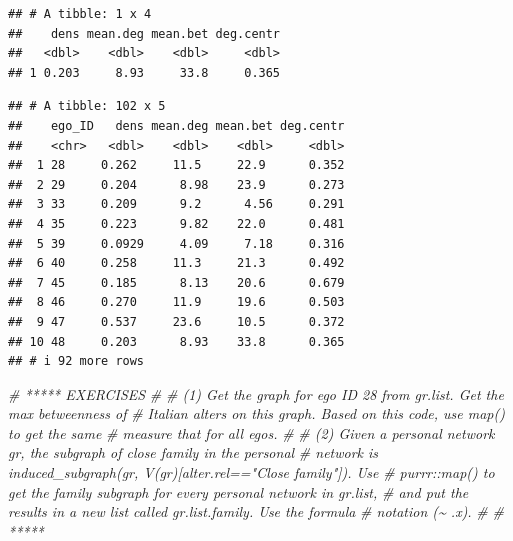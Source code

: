 \documentclass[
]{book}
\newenvironment{Shaded}{\begin{snugshade}}{\end{snugshade}}
\newcommand{\AttributeTok}[1]{\textcolor[rgb]{0.13,0.29,0.53}{#1}}
\newcommand{\CommentTok}[1]{\textcolor[rgb]{0.56,0.35,0.01}{\textit{#1}}}
\newcommand{\ConstantTok}[1]{\textcolor[rgb]{0.56,0.35,0.01}{#1}}
\newcommand{\FunctionTok}[1]{\textcolor[rgb]{0.13,0.29,0.53}{\textbf{#1}}}
\newcommand{\NormalTok}[1]{#1}
\newcommand{\SpecialCharTok}[1]{\textcolor[rgb]{0.81,0.36,0.00}{\textbf{#1}}}
\newcommand{\StringTok}[1]{\textcolor[rgb]{0.31,0.60,0.02}{#1}}
\begin{document}
\begin{verbatim}
## # A tibble: 1 x 4
##    dens mean.deg mean.bet deg.centr
##   <dbl>    <dbl>    <dbl>     <dbl>
## 1 0.203     8.93     33.8     0.365
\end{verbatim}

\begin{Shaded}
\end{Shaded}

\begin{verbatim}
## # A tibble: 102 x 5
##    ego_ID   dens mean.deg mean.bet deg.centr
##    <chr>   <dbl>    <dbl>    <dbl>     <dbl>
##  1 28     0.262     11.5     22.9      0.352
##  2 29     0.204      8.98    23.9      0.273
##  3 33     0.209      9.2      4.56     0.291
##  4 35     0.223      9.82    22.0      0.481
##  5 39     0.0929     4.09     7.18     0.316
##  6 40     0.258     11.3     21.3      0.492
##  7 45     0.185      8.13    20.6      0.679
##  8 46     0.270     11.9     19.6      0.503
##  9 47     0.537     23.6     10.5      0.372
## 10 48     0.203      8.93    33.8      0.365
## # i 92 more rows
\end{verbatim}

\begin{Shaded}
\begin{Highlighting}[]
\CommentTok{\# ***** EXERCISES}
\CommentTok{\#}
\CommentTok{\# (1) Get the graph for ego ID 28 from gr.list. Get the max betweenness of}
\CommentTok{\# Italian alters on this graph. Based on this code, use map() to get the same}
\CommentTok{\# measure that for all egos.}
\CommentTok{\#}
\CommentTok{\# (2) Given a personal network gr, the subgraph of close family in the personal}
\CommentTok{\# network is induced\_subgraph(gr, V(gr)[alter.rel=="Close family"]). Use}
\CommentTok{\# purrr::map() to get the family subgraph for every personal network in gr.list,}
\CommentTok{\# and put the results in a new list called gr.list.family. Use the formula}
\CommentTok{\# notation (\textasciitilde{} .x).}
\CommentTok{\#}
\CommentTok{\# *****}
\end{Highlighting}
\end{Shaded}
\end{document}
